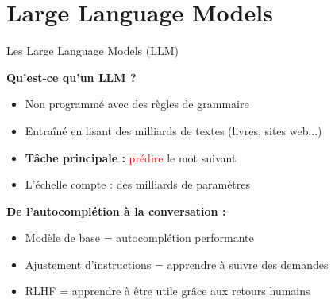 \section{Large Language Models}

\begin{frame}{Les Large Language Models (LLM)}

\textbf{Qu'est-ce qu'un LLM ?}
\begin{itemize}
    \item Non programmé avec des règles de grammaire
    \item Entraîné en lisant des milliards de textes (livres, sites web...)
    \item \textbf{Tâche principale :} \textcolor{red}{prédire} le mot suivant
    \item L'échelle compte : des milliards de paramètres
\end{itemize}

\vspace{0.5cm}

\textbf{De l'autocomplétion à la conversation :}
\begin{itemize}
    \item Modèle de base = autocomplétion performante
    \item Ajustement d'instructions = apprendre à suivre des demandes
    \item RLHF = apprendre à être utile grâce aux retours humains
\end{itemize}

\end{frame}

